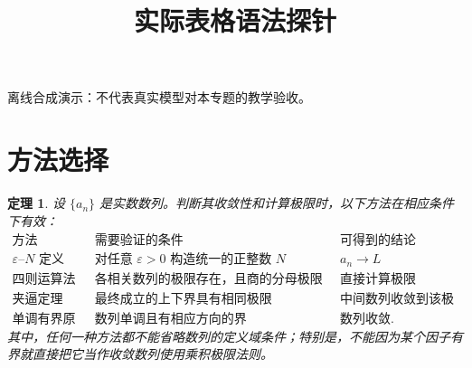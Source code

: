\documentclass[UTF8,fontset=fandol,11pt]{ctexart}
\title{实际表格语法探针}
\date{}
\newtheorem{theorem}[definition]{定理}
\begin{document}
\maketitle
\par\noindent 离线合成演示：不代表真实模型对本专题的教学验收。\par
\section{方法选择}\label{sec:S05}
\begin{theorem}
\label{thm:convergence-method-selection}设 \(\{a_n\}\) 是实数数列。判断其收敛性和计算极限时，以下方法在相应条件下有效：
\[
\begin{array}{c|c|c}
\text{方法}&\text{需要验证的条件}&\text{可得到的结论}\\ \hline
\text{$\varepsilon$--$N$ 定义}&\text{对任意 $\varepsilon>0$ 构造统一的正整数 $N$}&a_n\to L\\
\text{四则运算法则}&\text{各相关数列的极限存在，且商的分母极限非零}&\text{直接计算极限}\\
\text{夹逼定理}&\text{最终成立的上下界具有相同极限}&\text{中间数列收敛到该极限}\\
\text{单调有界原理}&\text{数列单调且有相应方向的界}&\text{数列收敛}.
\end{array}
\]
其中，任何一种方法都不能省略数列的定义域条件；特别是，不能因为某个因子有界就直接把它当作收敛数列使用乘积极限法则。
\end{theorem}
\end{document}
